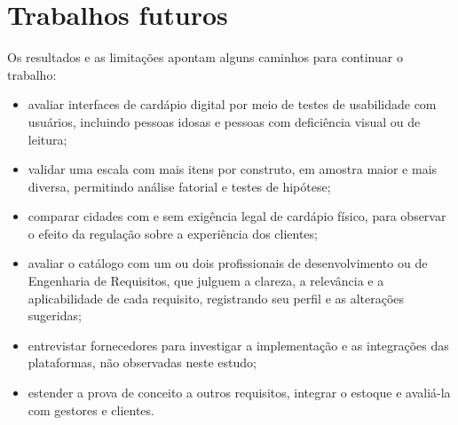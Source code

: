 \section{Trabalhos futuros}
\label{sec:conc-futuros}

Os resultados e as limitações apontam alguns caminhos para continuar o trabalho:

\begin{itemize}
    \item avaliar interfaces de cardápio digital por meio de testes de usabilidade com usuários, incluindo pessoas idosas e pessoas com deficiência visual ou de leitura;
    \item validar uma escala com mais itens por construto, em amostra maior e mais diversa, permitindo análise fatorial e testes de hipótese;
    \item comparar cidades com e sem exigência legal de cardápio físico, para observar o efeito da regulação sobre a experiência dos clientes;
    \item avaliar o catálogo com um ou dois profissionais de desenvolvimento ou de Engenharia de Requisitos, que julguem a clareza, a relevância e a aplicabilidade de cada requisito, registrando seu perfil e as alterações sugeridas;
    \item entrevistar fornecedores para investigar a implementação e as integrações das plataformas, não observadas neste estudo;
    \item estender a prova de conceito a outros requisitos, integrar o estoque e avaliá-la com gestores e clientes.
\end{itemize}
